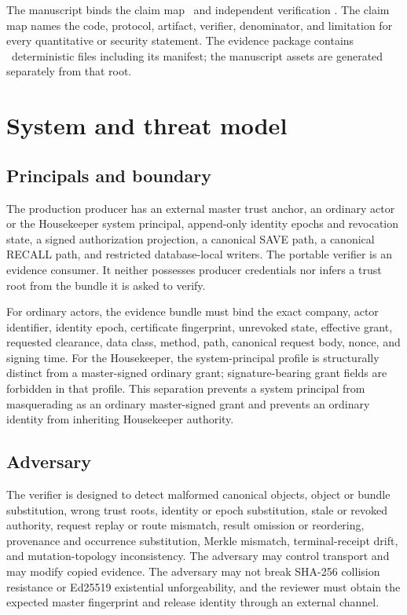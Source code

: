 \documentclass[10pt]{article}
\begin{document}
The manuscript binds the claim map \MutMemClaimMapRoot\ and independent
verification \MutMemIndependentVerificationRoot. The claim map names the code,
protocol, artifact, verifier, denominator, and limitation for every quantitative
or security statement. The evidence package contains
\MutMemEvidenceManifestOutputCount\ deterministic files including its manifest;
the manuscript assets are generated separately from that root.

\section{System and threat model}

\subsection{Principals and boundary}

The production producer has an external master trust anchor, an ordinary actor
or the Housekeeper system principal, append-only identity epochs and revocation
state, a signed authorization projection, a canonical SAVE path, a canonical
RECALL path, and restricted database-local writers. The portable verifier is an
evidence consumer. It neither possesses producer credentials nor infers a trust
root from the bundle it is asked to verify.

For ordinary actors, the evidence bundle must bind the exact company, actor
identifier, identity epoch, certificate fingerprint, unrevoked state, effective
grant, requested clearance, data class, method, path, canonical request body,
nonce, and signing time. For the Housekeeper, the system-principal profile is
structurally distinct from a master-signed ordinary grant; signature-bearing
grant fields are forbidden in that profile. This separation prevents a system
principal from masquerading as an ordinary master-signed grant and prevents an
ordinary identity from inheriting Housekeeper authority.

\subsection{Adversary}

The verifier is designed to detect malformed canonical objects, object or bundle
substitution, wrong trust roots, identity or epoch substitution, stale or revoked
authority, request replay or route mismatch, result omission or reordering,
provenance and occurrence substitution, Merkle mismatch, terminal-receipt drift,
and mutation-topology inconsistency. The adversary may control transport and may
modify copied evidence. The adversary may not break SHA-256 collision resistance
or Ed25519 existential unforgeability, and the reviewer must obtain the expected
master fingerprint and release identity through an external channel.
\end{document}
